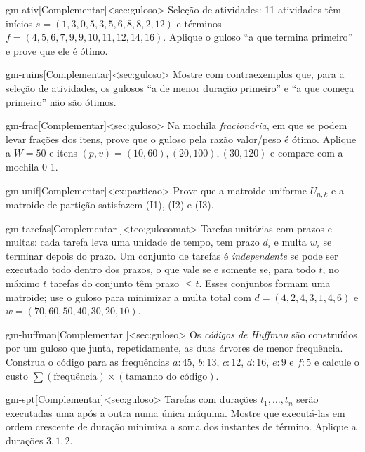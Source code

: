\excompl
\begin{exercicio}{gm-ativ}[Complementar]<sec:guloso>
Seleção de atividades: 11 atividades têm inícios $s=(1,3,0,5,3,5,6,8,8,2,12)$ e términos $f=(4,5,6,7,9,9,10,11,12,14,16)$. Aplique o guloso ``a que termina primeiro'' e prove que ele é ótimo.
\end{exercicio}
\begin{exercicio}{gm-ruins}[Complementar]<sec:guloso>
Mostre com contraexemplos que, para a seleção de atividades, os gulosos ``a de menor duração primeiro'' e ``a que começa primeiro'' não são ótimos.
\end{exercicio}
\begin{exercicio}{gm-frac}[Complementar]<sec:guloso>
Na mochila \emph{fracionária}, em que se podem levar frações dos itens, prove que o guloso pela razão valor/peso é ótimo. Aplique a $W=50$ e itens $(p,v)=(10,60),(20,100),(30,120)$ e compare com a mochila 0-1.
\end{exercicio}
\begin{exercicio}{gm-unif}[Complementar]<ex:particao>
Prove que a matroide uniforme $U_{n,k}$ e a matroide de partição satisfazem (I1), (I2) e (I3).
\end{exercicio}
\begin{exercicio}{gm-tarefas}[Complementar \estrela]<teo:gulosomat>
Tarefas unitárias com prazos e multas: cada tarefa leva uma unidade de tempo, tem prazo $d_i$ e multa $w_i$ se terminar depois do prazo. Um conjunto de tarefas é \emph{independente} se pode ser executado todo dentro dos prazos, o que vale se e somente se, para todo $t$, no máximo $t$ tarefas do conjunto têm prazo $\le t$. Esses conjuntos formam uma matroide; use o guloso para minimizar a multa total com $d=(4,2,4,3,1,4,6)$ e $w=(70,60,50,40,30,20,10)$.
\end{exercicio}
\begin{exercicio}{gm-huffman}[Complementar \estrela]<sec:guloso>
Os \emph{códigos de Huffman} são construídos por um guloso que junta, repetidamente, as duas árvores de menor frequência. Construa o código para as frequências $a{:}45$, $b{:}13$, $c{:}12$, $d{:}16$, $e{:}9$ e $f{:}5$ e calcule o custo $\sum(\text{frequência})\times(\text{tamanho do código})$.
\end{exercicio}
\begin{exercicio}{gm-spt}[Complementar]<sec:guloso>
Tarefas com durações $t_1,\dots,t_n$ serão executadas uma após a outra numa única máquina. Mostre que executá-las em ordem crescente de duração minimiza a soma dos instantes de término. Aplique a durações $3,1,2$.
\end{exercicio}
